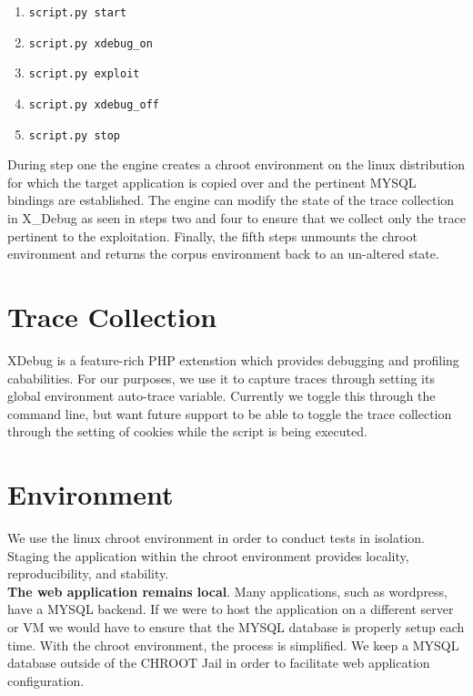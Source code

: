 \documentclass[letterpaper,twocolumn,10pt]{article}
\begin{document}
\begin{enumerate}
	\item {\tt script.py start}
	\item {\tt script.py xdebug\_on}
	\item {\tt script.py exploit}
	\item {\tt script.py xdebug\_off}
	\item {\tt script.py stop}
\end{enumerate}

During step one the engine creates a chroot environment on the linux distribution for which the target application is copied over and the pertinent MYSQL bindings are established.  The engine can modify the state of the trace collection in X\_Debug as seen in steps two and four to ensure that we collect only the trace pertinent to the exploitation.  Finally, the fifth steps unmounts the chroot environment and returns the corpus environment back to an un-altered state.


\section{Trace Collection}

XDebug is a feature-rich PHP extenstion which provides debugging and profiling cababilities.  For our purposes, we use it to capture traces through setting its global environment auto-trace variable.  Currently we toggle this through the command line, but want future support to be able to toggle the trace collection through the setting of cookies while the script is being executed.


\section{Environment}

We use the linux chroot environment in order to conduct tests in isolation.  Staging the application within the chroot environment provides locality, reproducibility, and stability.\\

{\bf The web application remains local}.  Many applications, such as wordpress, have a MYSQL backend.  If we were to host the application on a different server or VM we would have to ensure that the MYSQL database is properly setup each time.  With the chroot environment, the process is simplified. We keep a MYSQL database outside of the CHROOT Jail in order to facilitate web application configuration.  \\
\end{document}
